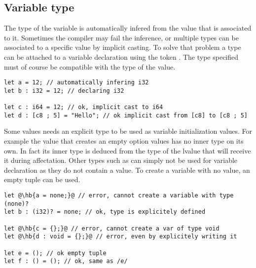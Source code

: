 \subsection{Variable type}
\label{sec:variable_type}

The type of the variable is automatically infered from the value that is
associated to it. Sometimes the compiler may fail the inference, or multiple
types can be associated to a specific value by implicit casting. To solve that
problem a type can be attached to a variable declaration using the token
\token{:}. The type specified must of course be compatible with the type of the
value.

\begin{lstlisting}[style=coloredverbatim, escapechar=@]
let a = 12; // automatically infering i32
let b : i32 = 12; // declaring i32

let c : i64 = 12; // ok, implicit cast to i64
let d : [c8 ; 5] = "Hello"; // ok implicit cast from [c8] to [c8 ; 5]
\end{lstlisting}

Some values needs an explicit type to be used as variable initialization values.
For example the value  that creates an empty option values has no
inner type on its own. In fact its inner type is deduced from the type of the
lvalue that will receive it during affectation. Other types such as 
can simply not be used for variable declaration as they do not contain a value.
To create a variable with no value, an empty tuple \token{()} can be used.

\begin{lstlisting}[style=coloredverbatim, escapechar=@]
let @\hb{a = none;}@ // error, cannot create a variable with type (none)?
let b : (i32)? = none; // ok, type is explicitely defined

let @\hb{c = {};}@ // error, cannot create a var of type void
let @\hb{d : void = {};}@ // error, even by explicitely writing it

let e = (); // ok empty tuple
let f : () = (); // ok, same as /e/
\end{lstlisting}


\vfill%
\pagebreak
